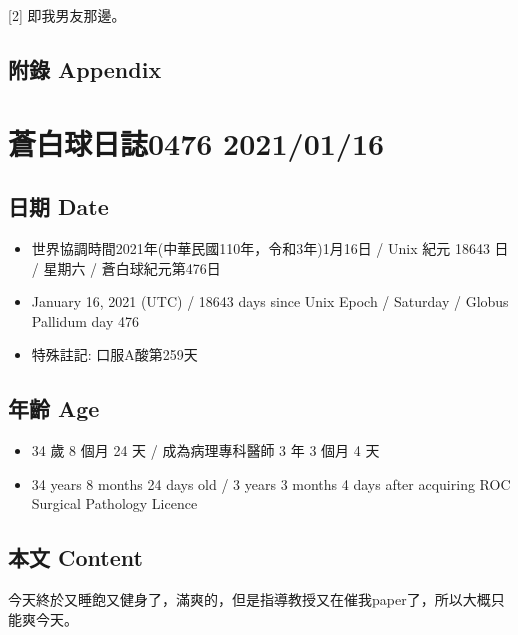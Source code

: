 \documentclass[
]{article}
\providecommand{\tightlist}{%
  \setlength{\itemsep}{0pt}\setlength{\parskip}{0pt}}
\begin{document}
{[}2{]} 即我男友那邊。

\hypertarget{ux9644ux9304-appendix-14}{%
\subsection{附錄 Appendix}\label{ux9644ux9304-appendix-14}}

\hypertarget{ux84bcux767dux7403ux65e5ux8a8c0476-20210116}{%
\section{蒼白球日誌0476
2021/01/16}\label{ux84bcux767dux7403ux65e5ux8a8c0476-20210116}}

\hypertarget{ux65e5ux671f-date-15}{%
\subsection{日期 Date}\label{ux65e5ux671f-date-15}}

\begin{itemize}
\tightlist
\item
  世界協調時間2021年(中華民國110年，令和3年)1月16日 / Unix 紀元 18643 日
  / 星期六 / 蒼白球紀元第476日
\item
  January 16, 2021 (UTC) / 18643 days since Unix Epoch / Saturday /
  Globus Pallidum day 476
\item
  特殊註記: 口服A酸第259天
\end{itemize}

\hypertarget{ux5e74ux9f61-age-15}{%
\subsection{年齡 Age}\label{ux5e74ux9f61-age-15}}

\begin{itemize}
\tightlist
\item
  34 歲 8 個月 24 天 / 成為病理專科醫師 3 年 3 個月 4 天
\item
  34 years 8 months 24 days old / 3 years 3 months 4 days after
  acquiring ROC Surgical Pathology Licence
\end{itemize}

\hypertarget{ux672cux6587-content-15}{%
\subsection{本文 Content}\label{ux672cux6587-content-15}}

今天終於又睡飽又健身了，滿爽的，但是指導教授又在催我paper了，所以大概只能爽今天。
\end{document}
